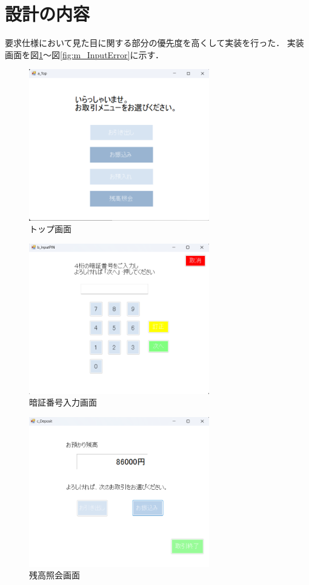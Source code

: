 \documentclass{jlreq}
\numberwithin{equation}{section}
\begin{document}
\section{設計の内容}
要求仕様において見た目に関する部分の優先度を高くして実装を行った．
実装画面を図\ref{fig:a_top}～図\ref{fig:m_InputError}に示す．

\begin{figure}[H]
  \centering
  \includegraphics[width=0.7\textwidth]{image/a_top.png}
  \caption{トップ画面}
  \label{fig:a_top}

\end{figure}
\begin{figure}[H]
  \centering
  \includegraphics[width=0.7\textwidth]{image/b_inputPIN.png}
  \caption{暗証番号入力画面}
  \label{fig:b_InputPIN}
\end{figure}
\begin{figure}[H]
  \centering
  \includegraphics[width=0.7\textwidth]{image/c_Deposit.png}
  \caption{残高照会画面}
  \label{fig:c_Deposit}
\end{figure}
\end{document}
